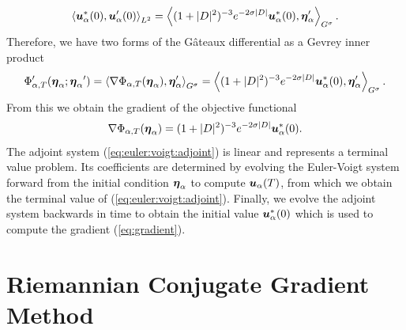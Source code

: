 \begin{equation}
\left\langle \boldsymbol u^*_\alpha(0),\boldsymbol u'_\alpha(0)\right\rangle_{L^2} = \left\langle (1+|D|^2)^{-3}e^{-2\sigma|D|} \boldsymbol u^*_\alpha(0),{\boldsymbol \eta'_\alpha} \right\rangle_{G^\sigma}.
\end{equation}
Therefore, we have two forms of the G\^{a}teaux differential as a Gevrey inner product
\begin{equation}
\Phi'_{\alpha,T}({\boldsymbol \eta_\alpha};{\boldsymbol \eta_\alpha}') = \left\langle \nabla\Phi_{\alpha,T}({\boldsymbol \eta_\alpha}),{\boldsymbol \eta'_\alpha} \right\rangle_{G^\sigma} = \left\langle (1+|D|^2)^{-3}e^{-2\sigma|D|} \boldsymbol u^*_\alpha(0),{\boldsymbol \eta'_\alpha} \right\rangle_{G^\sigma}.
\end{equation}
From this we obtain the gradient of the objective functional
\begin{equation}\label{eq:gradient}
\nabla \Phi_{\alpha,T}({\boldsymbol \eta_\alpha}) = (1+|D|^2)^{-3}e^{-2\sigma|D|}\boldsymbol u^*_\alpha(0).
\end{equation}
The adjoint system (\ref{eq:euler:voigt:adjoint}) is linear and represents a terminal value problem. Its coefficients are determined by evolving the Euler-Voigt system forward from the initial condition ${\boldsymbol \eta_\alpha}$ to compute $\boldsymbol u_\alpha(T)$, from which we obtain the terminal value of (\ref{eq:euler:voigt:adjoint}). Finally, we evolve the adjoint system backwards in time to obtain the initial value $\boldsymbol u^*_\alpha(0)$ which is used to compute the gradient (\ref{eq:gradient}).

\section{Riemannian Conjugate Gradient Method}\label{sec:Riemannian Conjugate Gradient Method}

